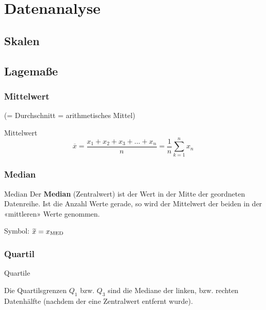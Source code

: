 \hrulefill
\section*{Datenanalyse}

\subsection*{Skalen}
\vspace{5mm}


\hrulefill
\begin{multicols}{2}

\subsection*{Lagemaße}
\subsubsection*{Mittelwert}
(= Durchschnitt = arithmetisches Mittel)

\begin{definition*}{Mittelwert}{}
$$\overline{x} = \frac{x_1 + x_2 + x_3 + ... + x_n}{n}=  \frac1n\sum_{k=1}^nx_n$$
\end{definition*}

\subsubsection*{Median}
\begin{definition*}{Median}{}
Der \textbf{Median} (Zentralwert) ist der Wert in der Mitte der geordneten Datenreihe. Ist
die Anzahl Werte gerade, so wird der Mittelwert der beiden in der
«mittleren» Werte genommen.

Symbol: $\widetilde{x} = x_{\textrm{MED}}$
\end{definition*}

\subsubsection*{Quartil}

\begin{rezept*}{Quartile}{}

Die Quartilsgrenzen $Q_1$ bzw. $Q_3$ sind die Mediane der linken,
bzw. rechten Datenhälfte (nachdem der eine Zentralwert entfernt
wurde).


\end{rezept*}
\end{multicols}
